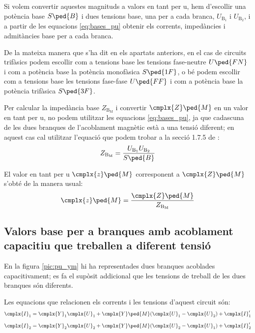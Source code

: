 Si volem convertir aquestes magnituds a valors en tant per u, hem d'escollir  una potència base $S\ped{B}$ i dues tensions base, una  per a cada branca, $U_{\text{B}_1}$ i  $U_{\text{B}_2}$, i a partir de les equacions \eqref{eq:bases_pu} obtenir els corrents, impedàncies i admitàncies base per a cada branca.

De la mateixa manera que s'ha dit en els apartats anteriors, en el cas de circuits trifàsics podem escollir com a tensions base les tensions fase-neutre $U\ped{FN}$ i com a potència base la potència  monofàsica $S\ped{1F}$, o bé podem escollir com a tensions base les tensions fase-fase $U\ped{FF}$ i com a potència base la potència trifàsica $S\ped{3F}$.


Per calcular la impedància base $Z_{\text{B}_\text{M}}$ i convertir $\cmplx{Z}\ped{M}$ en un valor en tant per u, no podem utilitzar les equacions \eqref{eq:bases_pu}, ja que cadascuna de les dues branques de l'acoblament magnètic està a una tensió diferent; en aquest cas cal utilitzar l'equació que podem trobar a la secció 1.7.5 de \cite{TLE}:
\begin{equation}
    Z_{\text{B}_\text{M}} = \frac{U_{\text{B}_1} U_{\text{B}_2}} {S\ped{B}}
\end{equation}

El valor en tant per u $\cmplx{z}\ped{M}$ corresponent a $\cmplx{Z}\ped{M}$ s'obté de la manera usual:
\begin{equation}
    \cmplx{z}\ped{M} = \frac{\cmplx{Z}\ped{M}}{Z_{\text{B}_\text{M}}}
\end{equation}


\subsection{Valors base per a branques amb acoblament capacitiu que treballen a diferent tensió}

En la figura \vref{pic:pu_ym} hi ha representades dues branques acoblades capacitivament; es fa el supòsit addicional que les tensions de treball de les dues branques són diferents.

\begin{center}
    
    \label{pic:pu_ym}
\end{center}

Les equacions que relacionen els corrents i les tensions d'aquest circuit són:
\begin{subequations}
\begin{align}
    \cmplx{I}_1  &= \cmplx{Y}_1 \cmplx{U}_1 +  \cmplx{Y}\ped{M}(\cmplx{U}_1-\cmplx{U}_2)  + \cmplx{I}'_1   \\[2mm]
    \cmplx{I}_2  &= \cmplx{Y}_2 \cmplx{U}_2 +  \cmplx{Y}\ped{M}(\cmplx{U}_2-\cmplx{U}_1)  + \cmplx{I}'_2
\end{align}
\end{subequations}

